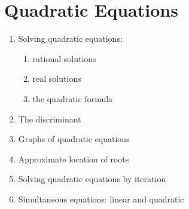 
\chapter{Quadratic Equations}

\begin{enumerate}
\item Solving quadratic equations:
  \begin{enumerate}
  \item rational solutions

  \item real solutions

  \item the quadratic formula
  \end{enumerate}

\item The discriminant

\item Graphs of quadratic equations

\item Approximate location of roots

\item Solving quadratic equations by iteration

\item Simultaneous equations: linear and quadratic
\end{enumerate}
